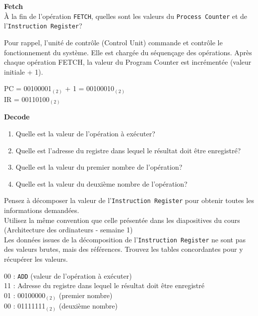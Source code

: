 \begin{Exercice}[5 minutes]\textbf{Fetch}\\
    À la fin de l'opération \lstinline{FETCH}, quelles sont les valeurs du \lstinline{Process Counter} et de l'\lstinline{Instruction Register}?
\end{Exercice}
   \begin{conseil}
    Pour rappel, l’unité de contrôle (Control Unit) commande et contrôle le fonctionnement du système. Elle est chargée du séquençage des opérations. Après chaque opération FETCH, la valeur du Program Counter est incrémentée (valeur initiale + 1).
    \end{conseil}
\begin{solution}
    PC = 00100001$_{(2)}$ + 1 = 00100010$_{(2)}$\\
    IR = 00110100$_{(2)}$
\end{solution}

\begin{Exercice}[5 minutes] \textbf{Decode}
    \begin{enumerate}
        \item Quelle est la valeur de l'opération à exécuter?
        \item Quelle est l'adresse du registre dans lequel le résultat doit être enregistré?
        \item Quelle est la valeur du premier nombre de l'opération?
        \item Quelle est la valeur du deuxième nombre de l'opération?
    \end{enumerate}
\end{Exercice}
   \begin{conseil}
    Pensez à décomposer la valeur de l’\lstinline{Instruction Register} pour obtenir toutes les informations demandées.\\
    Utilisez la même convention que celle présentée dans les diapositives du cours (Architecture des ordinateurs - semaine 1)\\
    Les données issues de la décomposition de l’\lstinline{Instruction Register} ne sont pas des valeurs brutes, mais des références. Trouvez les tables concordantes pour y récupérer les valeurs.

    \end{conseil}
\begin{solution}
    00 : \lstinline{ADD} (valeur de l'opération à exécuter)\\
    11 : Adresse du registre dans lequel le résultat doit être enregistré\\
    01 : 00100000$_{(2)}$ (premier nombre)\\
    00 : 01111111$_{(2)}$ (deuxième nombre)
\end{solution}

